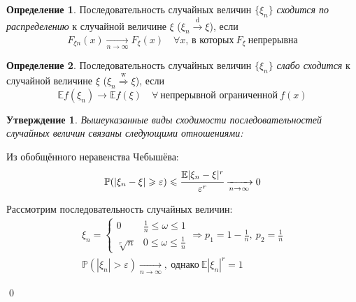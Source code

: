 \documentclass[oneside,final,14pt]{extreport}
\renewenvironment{proof}{{\bfseries Доказательство.}}{\qed}
\theoremstyle{plain}
\newtheorem*{thm*}{Утверждение}
\theoremstyle{definition}
\newtheorem*{defn}{Определение}
\theoremstyle{named}
\begin{document}
\begin{defn}
    Последовательность случайных величин $\{\xi_n\}$ {\it сходится по распределению} к случайной величине $\xi$ ($\xi_n \xrightarrow[]{\text{d}} \xi$), если
    \begin{equation*}
        F_{\xi n}(x) \xrightarrow[n \to \infty]{} F_{\xi}(x) \quad \forall x, \, \text{в которых}~ F_{\xi} ~\text{непрерывна}
    \end{equation*}
\end{defn}

\begin{defn}
    Последовательность случайных величин $\{\xi_n\}$ {\it слабо сходится} к случайной величине $\xi$ ($\xi_n \stackrel{\text{w}}{\Rightarrow} \xi$), если
    \begin{equation*}
        \mathbb{E} f\left(\xi_{n}\right) \rightarrow \mathbb{E} f(\xi) \quad \forall~ \text{непрерывной ограниченной}~ f(x)
    \end{equation*}
\end{defn}
\pagebreak
\begin{thm*}
    Вышеуказанные виды сходимости последовательностей случайных величин связаны следующими отношениями:
    
\end{thm*}

\begin{proof}\par
     Из обобщённого неравенства Чебышёва:
    \begin{equation*}
        \mathbb{P}(|\xi_n - \xi| \geqslant \varepsilon) \leqslant \cfrac{\mathbb{E}|\xi_n - \xi|^{r}}{\varepsilon^{r}} \xrightarrow[n \to \infty]{} 0
    \end{equation*}
    
     Рассмотрим последовательность случайных величин:
    \begin{gather*}
        \xi_n = \left\{\begin{array}{ll}
                0 &  \frac{1}{n} \leqslant \omega \leqslant 1 \\
                \sqrt[r]{n} & 0 \leqslant \omega \leqslant \frac{1}{n}
        \end{array}\right. \Rightarrow p_1 = 1 - \frac{1}{n},~ p_2 = \frac{1}{n} \\
        \mathbb{P}(|\xi_n| > \varepsilon) \xrightarrow[n \to \infty]{},~ \text{однако}~\mathbb{E}|\xi_n|^{r}=1
    \end{gather*}
    
\end{proof}
\end{document}
